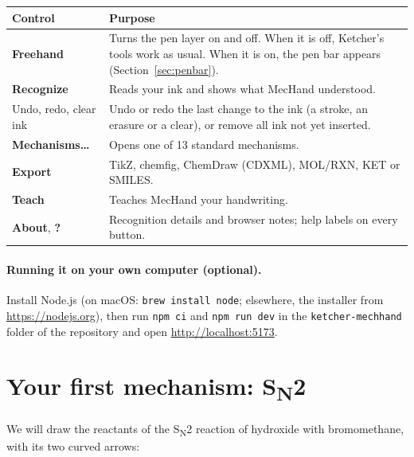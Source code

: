 \documentclass[11pt,a4paper]{article}
\newcommand{\key}[1]{\fbox{\footnotesize\ttfamily #1}}
\newcommand{\btn}[1]{\textsf{\textbf{#1}}}
\begin{document}
\begin{center}
\begin{tabularx}{\linewidth}{@{}lX@{}}
  \toprule
  Control & Purpose \\
  \midrule
  \btn{Freehand} \key{Alt/Option F} & Turns the pen layer on and off. When it is off, Ketcher's tools work as usual. When it is on, the pen bar appears (Section~\ref{sec:penbar}). \\
  \btn{Recognize} \key{Space} & Reads your ink and shows what MecHand understood. \\
  Undo, redo, clear ink & Undo or redo the last change to the ink (a stroke, an erasure or a clear), or remove all ink not yet inserted. \\
  \btn{Mechanisms\ldots} & Opens one of 13 standard mechanisms. \\
  \btn{Export} & TikZ, chemfig, ChemDraw (CDXML), MOL/RXN, KET or SMILES. \\
  \btn{Teach} & Teaches MecHand your handwriting. \\
  \btn{About}, \btn{?} & Recognition details and browser notes; help labels on every button. \\
  \bottomrule
\end{tabularx}
\end{center}

\paragraph{Running it on your own computer (optional).}
Install Node.js (on macOS: \texttt{brew install node}; elsewhere, the installer from
\url{https://nodejs.org}), then run \texttt{npm ci} and \texttt{npm run dev} in the
\texttt{ketcher-mechhand} folder of the repository and open \url{http://localhost:5173}.

\section{Your first mechanism: S\textsubscript{N}2}

We will draw the reactants of the S\textsubscript{N}2 reaction of hydroxide with bromomethane,
with its two curved arrows:

\begin{center}
  
\end{center}
\end{document}
